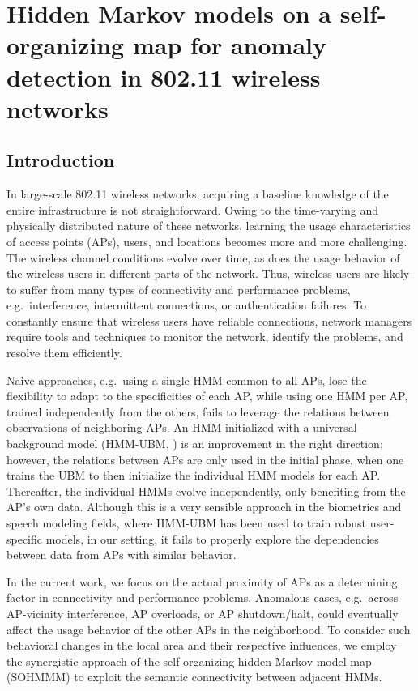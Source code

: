 \section{Hidden Markov models on a self-organizing map for anomaly detection in 802.11 wireless networks}
\label{sec:sohmmm}

\subsection{Introduction}
\label{sec:sohmmm_intro}
In large-scale 802.11 wireless networks, acquiring a baseline knowledge of the entire infrastructure is not straightforward. Owing to the time-varying and physically distributed nature of these networks, learning the usage characteristics of access points (APs), users, and locations becomes more and more challenging. The wireless channel conditions evolve over time, as does the usage behavior of the wireless users in different parts of the network. Thus, wireless users are likely to suffer from many types of connectivity and performance problems, e.g.\ interference, intermittent connections, or authentication failures. To constantly ensure that wireless users have reliable connections, network managers require tools and techniques to monitor the network, identify the problems, and resolve them efficiently.

Naive approaches, e.g.\ using a single HMM common to all APs, lose the flexibility to adapt to the specificities of each AP, while using one HMM per AP, trained independently from the others, fails to leverage the relations between observations of neighboring APs. An HMM initialized with a universal background model (HMM-UBM, \citet{Anisa2017}) is an improvement in the right direction; however, the relations between APs are only used in the initial phase, when one trains the UBM to then initialize the individual HMM models for each AP. Thereafter, the individual HMMs evolve independently, only benefiting from the AP's own data. Although this is a very sensible approach in the biometrics and speech modeling fields, where HMM-UBM has been used to train robust user-specific models, in our setting, it fails to properly explore the dependencies between data from APs with similar behavior.

In the current work, we focus on the actual proximity of APs as a determining factor in connectivity and performance problems. Anomalous cases, e.g.\ across-AP-vicinity interference, AP overloads, or AP shutdown/halt, could eventually affect the usage behavior of the other APs in the neighborhood. To consider such behavioral changes in the local area and their respective influences, we employ the synergistic approach of the self-organizing hidden Markov model map (SOHMMM) to exploit the semantic connectivity between adjacent HMMs.

